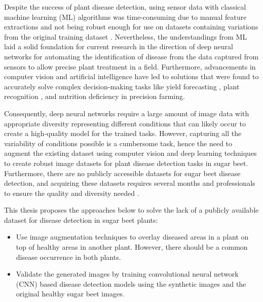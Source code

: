 Despite the success of plant disease detection, using sensor data with classical machine learning (ML) algorithms was time-consuming due to manual feature extractions and not being robust enough for use on datasets containing variations from the original training dataset \cite{ferentinos2018deep}. Nevertheless, the understandings from ML laid a solid foundation for current research in the direction of deep neural networks for automating the identification of disease from the data captured from sensors to allow precise plant treatment in a field. Furthermore, advancements in computer vision and artificial intelligence have led to solutions that were found to accurately solve complex decision-making tasks like yield forecasting \cite{liu2017computer}, plant recognition \cite{gao2017mobile}, and nutrition deficiency \cite{yi2020deep} in precision farming.

Consequently, deep neural networks require a large amount of image data with appropriate diversity representing different conditions that can likely occur to create a high-quality model for the trained tasks. However, capturing all the variability of conditions possible is a cumbersome task, hence the need to augment the existing dataset using computer vision and deep learning techniques to create robust image datasets for plant disease detection tasks in sugar beet. Furthermore, there are no publicly accessible datasets for sugar beet disease detection, and acquiring these datasets requires several months and professionals to ensure the quality and diversity needed \cite{barreto2020hyperspectral, jay2020scoring}.

This thesis proposes the approaches below to solve the lack of a publicly available dataset for disease detection in sugar beet plants: 
 \begin{itemize}
     \item Use image augmentation techniques to overlay diseased areas in a plant on top of healthy areas in another plant. However, there should be a common disease occurrence in both plants.
     \item Validate the generated images by training convolutional neural network (CNN) based disease detection models using the synthetic images and the original healthy sugar beet images.

 \end{itemize}


